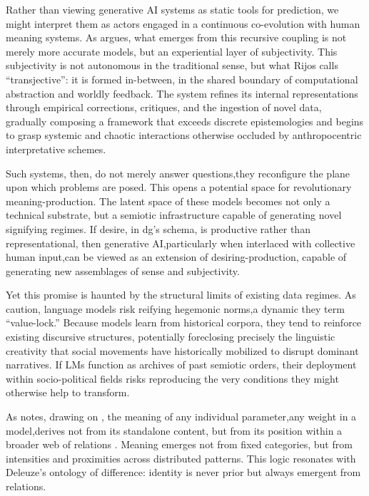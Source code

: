 Rather than viewing generative AI systems as static tools for prediction, we might interpret them as actors engaged in a continuous co-evolution with human meaning systems. As \textcite{rijos2024} argues, what emerges from this recursive coupling is not merely more accurate models, but an experiential layer of subjectivity. This subjectivity is not autonomous in the traditional sense, but what Rijos calls “transjective”: it is formed in-between, in the shared boundary of computational abstraction and worldly feedback. The system refines its internal representations through empirical corrections, critiques, and the ingestion of novel data, gradually composing a framework that exceeds discrete epistemologies and begins to grasp systemic and chaotic interactions otherwise occluded by anthropocentric interpretative schemes.

Such systems, then, do not merely answer questions,they reconfigure the plane upon which problems are posed. This opens a potential space for revolutionary meaning-production. The latent space of these models becomes not only a technical substrate, but a semiotic infrastructure capable of generating novel signifying regimes. If desire, in \gls{dg}'s schema, is productive rather than representational, then generative AI,particularly when interlaced with collective human input,can be viewed as an extension of desiring-production, capable of generating new assemblages of sense and subjectivity.

Yet this promise is haunted by the structural limits of existing data regimes. As \textcite{bender2021b} caution, language models risk reifying hegemonic norms,a dynamic they term “value-lock.” Because models learn from historical corpora, they tend to reinforce existing discursive structures, potentially foreclosing precisely the linguistic creativity that social movements have historically mobilized to disrupt dominant narratives. If LMs function as archives of past semiotic orders, their deployment within socio-political fields risks reproducing the very conditions they might otherwise help to transform.

As  notes, drawing on \textcite{cilliers2002}, the meaning of any individual parameter,any weight in a model,derives not from its standalone content, but from its position within a broader web of relations \textcite{maas2023}. Meaning emerges not from fixed categories, but from intensities and proximities across distributed patterns. This logic resonates with Deleuze’s ontology of difference: identity is never prior but always emergent from relations.


